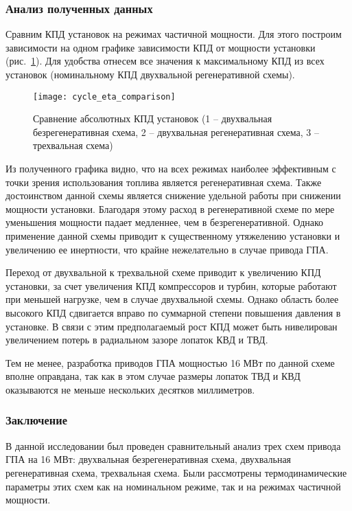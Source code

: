 \subsubsection{Анализ полученных данных}
Сравним КПД установок на режимах частичной мощности. Для этого построим зависимости на одном графике зависимости КПД от мощности установки (рис.~\ref{img:cycle_eta_comparison}). Для удобства отнесем все значения к максимальному КПД из всех установок (номинальному КПД двухвальной регенеративной схемы).

\begin{figure}[H]
    \centering
    \texttt{[image: cycle\_eta\_comparison]}
    \caption{Сравнение абсолютных КПД установок (1 – двухвальная безрегенеративная схема, 2 – двухвальная регенеративная схема, 3 – трехвальная схема)}
    \label{img:cycle_eta_comparison}
\end{figure}

Из полученного графика видно, что на всех режимах наиболее эффективным с точки зрения использования топлива является регенеративная схема. Также достоинством данной схемы является снижение удельной работы при снижении мощности установки. Благодаря этому расход в регенеративной схеме по мере уменьшения мощности падает медленнее, чем в безрегенеративной. Однако применение данной схемы приводит к существенному утяжелению установки и увеличению ее инертности, что крайне нежелательно в случае привода ГПА. 

Переход от двухвальной к трехвальной схеме приводит к увеличению КПД установки, за счет увеличения КПД компрессоров и турбин, которые работают при меньшей нагрузке, чем в случае двухвальной схемы. Однако область более высокого КПД сдвигается вправо по суммарной степени повышения давления в установке. В связи с этим предполагаемый рост КПД может быть нивелирован увеличением потерь в радиальном зазоре лопаток КВД и ТВД.

Тем не менее, разработка приводов ГПА мощностью 16 МВт по данной схеме вполне оправдана, так как в этом случае размеры лопаток ТВД и КВД оказываются не меньше нескольких десятков миллиметров.


\subsubsection{Заключение}

В данной исследовании был проведен сравнительный анализ трех схем привода ГПА на 16 МВт: двухвальная безрегенеративная схема, двухвальная регенеративная схема, трехвальная схема. Были рассмотрены термодинамические параметры этих схем как на номинальном режиме, так и на режимах частичной мощности.

